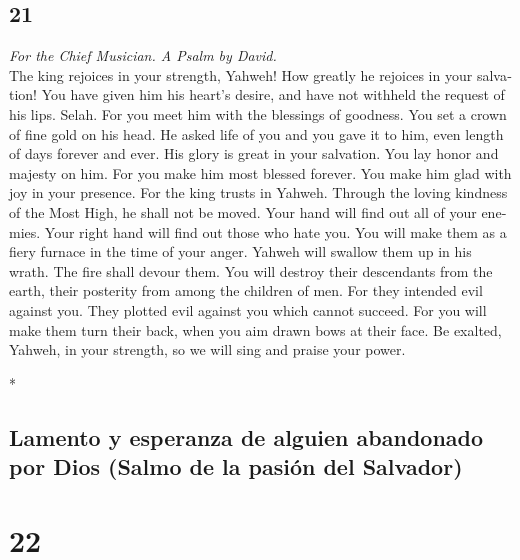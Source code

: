 \begin{paracol}{2}
\switchcolumn
\begin{otherlanguage}{english}

\hypertarget{section-41}{%
\section{21}\label{section-41}}

\emph{For the Chief Musician. A Psalm by David.}\\
 The king rejoices in your strength, Yahweh! How greatly
he rejoices in your salvation!  You have given him his
heart's desire, and have not withheld the request of his lips. Selah.
 For you meet him with the blessings of goodness. You set
a crown of fine gold on his head.  He asked life of you
and you gave it to him, even length of days forever and ever.
 His glory is great in your salvation. You lay honor and
majesty on him.  For you make him most blessed forever.
You make him glad with joy in your presence.  For the king
trusts in Yahweh. Through the loving kindness of the Most High, he shall
not be moved.  Your hand will find out all of your
enemies. Your right hand will find out those who hate you.
 You will make them as a fiery furnace in the time of your
anger. Yahweh will swallow them up in his wrath. The fire shall devour
them.  You will destroy their descendants from the earth,
their posterity from among the children of men.  For they
intended evil against you. They plotted evil against you which cannot
succeed.  For you will make them turn their back, when
you aim drawn bows at their face.  Be exalted, Yahweh, in
your strength, so we will sing and praise your power.

\end{otherlanguage}

\switchcolumn[0]*

\hypertarget{lamento-y-esperanza-de-alguien-abandonado-por-dios-salmo-de-la-pasiuxf3n-del-salvador}{%
\subsection{Lamento y esperanza de alguien abandonado por Dios (Salmo de
la pasión del
Salvador)}\label{lamento-y-esperanza-de-alguien-abandonado-por-dios-salmo-de-la-pasiuxf3n-del-salvador}}

\hypertarget{section-42}{%
\section{22}\label{section-42}}


\end{paracol}
